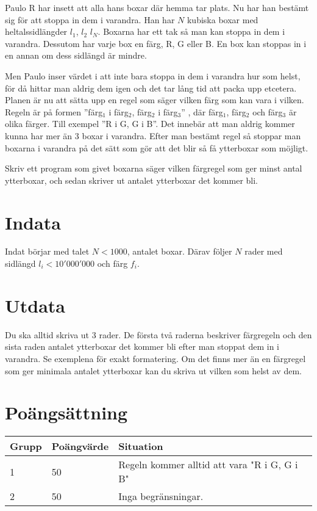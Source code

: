 
Paulo R har insett att alla hans boxar där hemma tar plats. Nu har han bestämt
sig för att stoppa in dem i varandra. Han har $N$ kubiska boxar med
heltalssidlängder $l_1$, $l_2$ \ellipsis $l_N$. Boxarna har ett tak så man kan stoppa in
dem i varandra. Dessutom har varje box en färg, R, G eller B. 
En box kan stoppas in i en annan om dess sidlängd är mindre.

Men Paulo inser värdet i att inte bara stoppa in dem i varandra hur som helst,
för då hittar man aldrig dem igen och det tar lång tid att packa upp etcetera.
Planen är nu att sätta upp en regel som säger vilken färg som kan vara i
vilken. Regeln är på formen ''färg$_1$ i färg$_2$, färg$_2$ i färg$_3$'' , 
där färg$_1$, färg$_2$ och färg$_3$ är olika färger. Till exempel ''R i
G, G i B''. Det innebär att man aldrig kommer kunna har mer än 3 boxar i
varandra. Efter man bestämt regel så stoppar man boxarna i varandra på det sätt
som gör att det blir så få ytterboxar som möjligt.

Skriv ett program som givet boxarna säger vilken färgregel som ger minst antal
ytterboxar, och sedan skriver ut antalet ytterboxar det kommer bli.

\section*{Indata}

Indat börjar med talet $N < 1000$, antalet boxar. Därav följer $N$ rader med sidlängd
$l_i < 10'000'000$ och färg $f_i$.

\section*{Utdata}

Du ska alltid skriva ut 3 rader. De första två raderna beskriver färgregeln
och den sista raden antalet ytterboxar det kommer bli efter man stoppat dem in i
varandra. Se exemplena för exakt formatering. Om det finns mer än en färgregel 
som ger minimala antalet ytterboxar kan du skriva ut vilken som helst av dem.

\section*{Poängsättning}

\begin{tabular}{| l | l | l |}
\hline
Grupp & Poängvärde & Situation \\ \hline
1     & 50         & Regeln kommer alltid att vara "R i G, G i B" \\ \hline
2     & 50         & Inga begränsningar. \\ \hline
\end{tabular}
